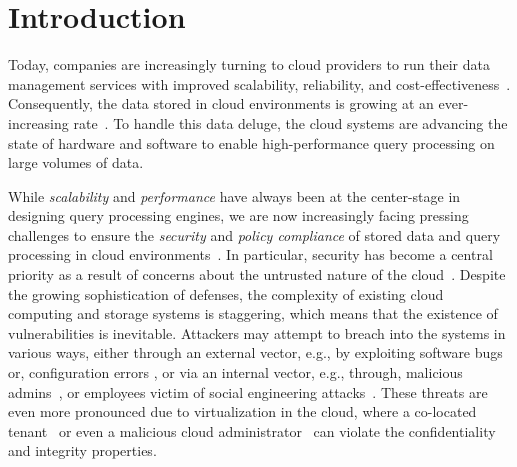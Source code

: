 \section{Introduction}
\label{sec:introduction}
Today, companies are increasingly turning to cloud providers to run their data management services with improved scalability, reliability, and cost-effectiveness~\cite{azure-cloud, google-cloud, berk-cloud}. Consequently, the data stored in cloud environments is growing at an ever-increasing rate~\cite{bhatotia2012, 200zetabytes, 175zetabytes}. To handle this data deluge, the cloud systems are advancing the state of hardware \cite{amazonaqua}
and software \cite{msintelligentquery, amazonaurora}
to enable high-performance query processing on large volumes of data. 

While {\em scalability} and {\em performance} have always been at the center-stage in designing query processing engines,
we are now increasingly facing pressing challenges to ensure the {\em security} and {\em policy compliance} of stored data and query processing in cloud environments~\cite{ahmad2018obliviate,10.14778/3342263.3342641,shastricorr2019,mohanpoly2019}. %
In particular, security has become a central priority as a result of concerns about the untrusted nature of the cloud~\cite{santos-hotcloud-2009}. Despite the growing sophistication of defenses, the complexity of existing cloud computing and storage systems is staggering, which means that the existence of vulnerabilities is inevitable. Attackers may attempt to breach into the systems in various ways, either through an external vector, e.g., by exploiting software bugs or, configuration errors \cite{facebook-dataselling}, or via an internal vector, e.g., through, malicious admins~\cite{santos2012, personel-dataleak}, or employees victim of social engineering attacks~\cite{Ashish-cloudsecuritysurvey}. These threats are even more pronounced due to virtualization in the cloud, where a co-located tenant~\cite{santos-security-2012} or even a malicious cloud administrator~\cite{nuno-bford-middleware-2012} can violate the confidentiality and integrity properties.

